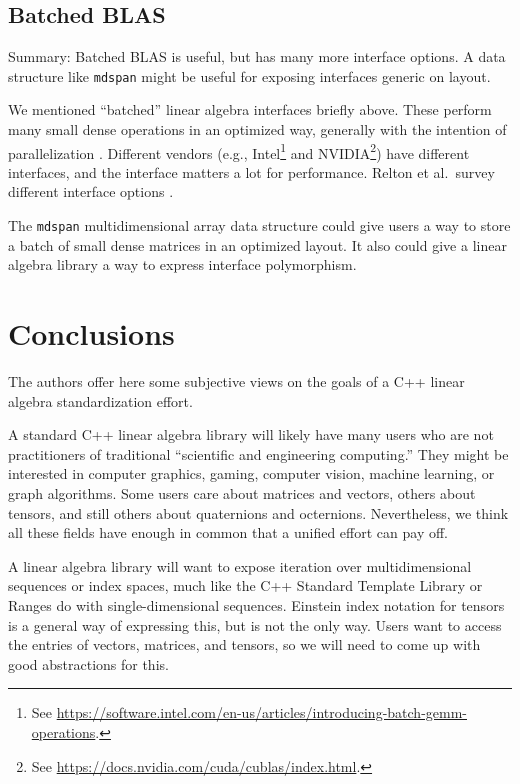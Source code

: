 \subsection{Batched BLAS}
\label{SS:other-standards:batched}

Summary: Batched BLAS is useful, but has many more interface options.
A data structure like \texttt{mdspan} \cite{P0009r8} might be useful
for exposing interfaces generic on layout.

We mentioned ``batched'' linear algebra interfaces briefly above.
These perform many small dense operations in an optimized way,
generally with the intention of parallelization
\cite{dongarra2016batched}.  Different vendors (e.g.,
Intel\footnote{See
  \url{https://software.intel.com/en-us/articles/introducing-batch-gemm-operations}.}
and NVIDIA\footnote{See
  \url{https://docs.nvidia.com/cuda/cublas/index.html}.}) have
different interfaces, and the interface matters a lot for performance.
Relton et al.\ survey different interface options
\cite{relton2016comparison}.

The \texttt{mdspan} \cite{P0009r8} multidimensional array data
structure could give users a way to store a batch of small dense
matrices in an optimized layout.  It also could give a linear algebra
library a way to express interface polymorphism.

\section{Conclusions}
\label{S:conclusions}

The authors offer here some subjective views on the goals of a C++
linear algebra standardization effort.

A standard C++ linear algebra library will likely have many users who
are not practitioners of traditional ``scientific and engineering
computing.''  They might be interested in computer graphics, gaming,
computer vision, machine learning, or graph algorithms.  Some users
care about matrices and vectors, others about tensors, and still
others about quaternions and octernions.  Nevertheless, we think all
these fields have enough in common that a unified effort can pay off.

A linear algebra library will want to expose iteration over
multidimensional sequences or index spaces, much like the C++ Standard
Template Library or Ranges do with single-dimensional sequences.
Einstein index notation for tensors is a general way of expressing
this, but is not the only way.  Users want to access the entries of
vectors, matrices, and tensors, so we will need to come up with good
abstractions for this.

